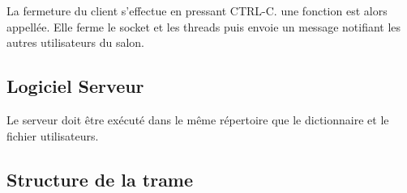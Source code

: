 \documentclass[a4paper, 12pt]{article}
\begin{document}
La fermeture du client s'effectue en pressant CTRL-C. une fonction est alors appellée. Elle ferme le socket et les threads puis envoie un message notifiant les autres utilisateurs du salon. 

\subsection{Logiciel Serveur}
Le serveur doit être exécuté dans le même répertoire que le dictionnaire et le fichier utilisateurs.


\subsection{Structure de la trame}
\end{document}
